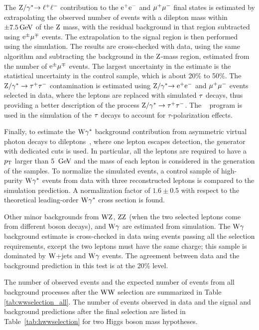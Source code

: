 \documentclass[11pt,twoside,a4paper,cmspaper,final,collab]{cms-tdr}
\begin{document}
The $\mathrm{Z}/\gamma^*{\to \ell^+\ell^-}$ contribution to the $\mathrm{e}^+\mathrm{e}^-$
and ${\mu^+}{\mu^-}$ final states is estimated by extrapolating
the observed number of events with a dilepton mass
within $\pm7.5\,\text{Ge\hspace{-.08em}V}$ of the $\mathrm{Z}$ mass, with the residual
background in that region subtracted using $\mathrm{e}^{\pm}{\mu}^{\mp}$ events.
The extrapolation to the signal region is then performed using the simulation.
The results are cross-checked with data, using the same algorithm and
subtracting the background in the $\mathrm{Z}$-mass region, estimated from the number of $\mathrm{e}^{\pm}{\mu}^{\mp}$ events.
The largest uncertainty in the estimate is the statistical
uncertainty in the control sample, which is about 20\% to 50\%.
The $\mathrm{\mathrm{Z}}/\gamma^* \to\tau^+\tau^-$ contamination is estimated using $\mathrm{\mathrm{Z}}/\gamma^*\mathrm{\to \mathrm{e}^+\mathrm{e}^-}$ and ${\mu^+}{\mu^-}$
events selected in data, where the leptons are replaced with simulated
$\tau$ decays, thus providing a better description of the process $\mathrm{\mathrm{Z}}/\gamma^* \to\tau^+\tau^-$. The \TAUOLA~\cite{TAUOLA}
program is used in the simulation of the $\tau$ decays to account for $\tau$-polarization effects.

Finally, to estimate the $\mathrm{W}\gamma^{*}$ background contribution
from asymmetric virtual photon decays to dileptons~\cite{wgammastart}, where one lepton escapes
detection, the \MADGRAPH generator~\cite{Alwall:2011uj} with dedicated cuts is
used. In particular, all the leptons are required to have a $p_{\mathrm{T}}$ larger than 5 $\,\text{Ge\hspace{-.08em}V}$ and
the mass of each lepton is considered in the generation of the samples. To normalize the
simulated events, a control sample of high-purity $\mathrm{W}\gamma^{*}$ events from data with three
reconstructed leptons is compared to the simulation prediction. A
normalization factor of $1.6\pm0.5$ with respect to the theoretical leading-order
$\mathrm{W}\gamma^{*}$ cross section is found.

Other minor backgrounds from $\mathrm{W}\mathrm{Z}$, $\mathrm{Z}\mathrm{Z}$ (when the two selected leptons come from
different boson decays), and $\mathrm{W}\gamma$ are estimated from simulation.
The $\mathrm{W}\gamma$ background estimate is cross-checked in data using events passing
all the selection requirements, except the two leptons must have the
same charge; this sample is dominated by $\mathrm{W}$+jets and $\mathrm{W}\gamma$
events. The agreement between data and the background prediction in this test is at the 20\% level.

The number of observed events and the expected number of events from
all background processes after the $\mathrm{W}\mathrm{W}$ selection
are summarized in Table \ref{tab:wwselection_all}. The number of events
observed in data and the signal and
background predictions after the final selection are listed in Table~\ref{tab:hwwselection} for two
Higgs boson mass hypotheses.
\end{document}
